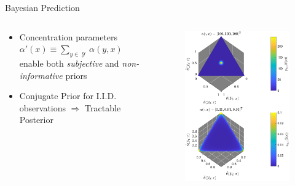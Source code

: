 \documentclass[xcolor=dvipsnames]{beamer}
\DeclareMathOperator{\Ycal}{\mathcal{Y}}
\begin{document}
\begin{frame}{}
\begin{columns}[T]
\begin{column}{.34\linewidth}
\begin{block}{Bayesian Prediction}
\begin{columns}[c]
\begin{column}{.49\linewidth}
\begin{itemize}
\item Concentration parameters $\alpha'(x) \equiv \sum_{y \in \Ycal} \alpha(y,x)$ enable both \emph{subjective} and \emph{non-informative} priors
\item Conjugate Prior for I.I.D. observations $\Rightarrow$ Tractable Posterior
\end{itemize}



\end{column}
\begin{column}{.44\linewidth}


\begin{figure}
\centering
\includegraphics[width=0.9\linewidth]{P_theta_tilde.pdf}
\end{figure}

\end{column}
\end{columns}




\end{block}
\end{column}
\end{columns}
\end{frame}
\end{document}
